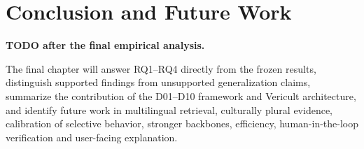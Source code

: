 \chapter{Conclusion and Future Work}
\label{ch:conclusion}

\textbf{TODO after the final empirical analysis.}

The final chapter will answer RQ1--RQ4 directly from the frozen results, distinguish supported findings from unsupported generalization claims, summarize the contribution of the D01--D10 framework and Vericult architecture, and identify future work in multilingual retrieval, culturally plural evidence, calibration of selective behavior, stronger backbones, efficiency, human-in-the-loop verification and user-facing explanation.
